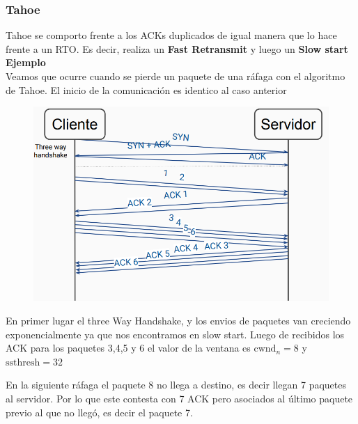\documentclass[titlepage,a4paper]{article}
\begin{document}
\subsubsection{Tahoe}

Tahoe se comporto frente a los ACKs duplicados de igual manera que lo hace frente a un RTO. Es decir, realiza un \textbf{Fast Retransmit} y luego un \textbf{Slow start} \\

\textbf{Ejemplo}\\

Veamos que ocurre cuando se pierde un paquete de una ráfaga con el algoritmo de Tahoe. El inicio de la comunicación es identico al caso anterior

\begin{figure}[H]
\centering
\includegraphics[width=\textwidth]{imagenes/resolucion2.png}
\end{figure}

En primer lugar el three Way Handshake, y los envios de paquetes van creciendo exponencialmente ya que nos encontramos en slow start. Luego de recibidos los ACK para los paquetes 3,4,5 y 6 el valor de la ventana es $\mathrm{cwnd}_n = 8$ y $\mathrm{ssthresh}  = 32$

En la siguiente ráfaga el paquete 8 no llega a destino, es decir llegan 7 paquetes al servidor. Por lo que este contesta con 7 ACK pero asociados al último paquete previo al que no llegó, es decir el paquete 7.
\end{document}
